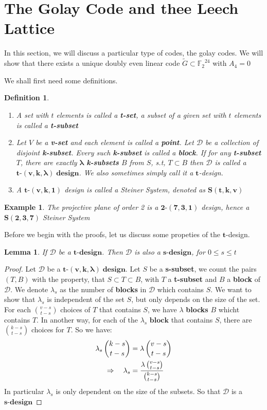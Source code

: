 \documentclass{article}
\newtheorem{lemma}[theorem]{Lemma}
\newtheorem{definition}[theorem]{Definition}
\newtheorem{example}[theorem]{Example}
\numberwithin{equation}{theorem}
\numberwithin{figure}{theorem}
\newcommand{\GExtend}{\ensuremath{\widetilde{G}}}
\newcommand{\Ftwo}{\ensuremath{\mathbb{F}_2}}
\newcommand{\tCompleteDesign}{\ensuremath{\bm{t\mbox{-}(v,k,\lambda)\; design}}}
\newcommand{\myBlock}{\textbf{block}}
\newcommand{\pluralMyBlock}{\textbf{blocks}}
\newcommand{\xDesign}[1]{\ensuremath{\bm{#1\mbox{-}design}}}
\begin{document}
\section{The Golay Code and thee Leech Lattice}
In this section, we will discuss a particular type of codes, the golay codes. We will show that there exists a unique doubly even linear code  $\GExtend \subset \Ftwo^{24}$ with $A_4 = 0$ 

We shall first need some definitions.
\begin{definition}\label{designDef} \hfill
	\begin{enumerate}
		\item A set with $t$ elements is called a \textbf{t-set}, a subset of a given set with $t$ elements is called a \textbf{t-subset}
		\item Let $V$ be a \textbf{v-set} and each element is called a \textbf{point}. Let $\mathscr{D}$ be a collection of disjoint \textbf{k-subset}. Every such \textbf{k-subset} is called a \textbf{block}. If for any \textbf{t-subset} $T$, there are exactly $\mathbf{\lambda}$ \textbf{k-subsets} $B$ from $S$, s.t, $T \subset B$ then $\mathscr{D}$ is called a \tCompleteDesign . We also sometimes simply call it a $\bm{t}$-design.
		\item A $\bm{t\mbox{-}(v,k,1)}$ design is called a \emph{Steiner System}, denoted as $\bm{S(t,k,v)}$
	\end{enumerate}
\end{definition}
\begin{example}\label{projPlane}
		The projective plane of order 2 is a $\bm{2\mbox{-}(7,3,1)}$ design, hence a $\bm{S(2,3,7)}$ \emph{Steiner System}
\end{example}

Before we begin with the proofs, let us discuss some propeties of the $\bm{t}$-design.
\begin{lemma}\label{propTdesign}
If $\mathscr{D}$ be a $\bm{t\mbox{-}design}$. Then $\mathscr{D}$ is also a $\bm{s\mbox{-}design}$, for $0 \leq s \leq t$
\end{lemma}
\begin{proof}
Let $\mathscr{D}$ be a \tCompleteDesign.
Let $S$ be a \textbf{s-subset}, we count the pairs $(T,B)$ with the property, that $S \subset T \subset B$, with $T$ a \textbf{t-subset} and $B$ a \textbf{block} of $\mathscr{D}$. We denote $\lambda_s$ as the number of \textbf{blocks} in $\mathscr{D}$ which contains $S$. We want to show that $\lambda_s$ is independent of the set $S$, but only depends on the size of the set. 
For each $\binom{v-s}{t-s}$ choices of $T$ that contains $S$, we have $\lambda$ {\pluralMyBlock} $B$ whicht contains $T$. In another way, for each of the $\lambda_s$ $\myBlock$ that contains $S$, there are $\binom{k-s}{t-s}$ choices for $T$. So we have:
\begin{align}
	\lambda_s \, \binom{k-s}{t-s} &= \lambda \, \binom{v-s}{t-s} \notag\\
	\Rightarrow  \quad \lambda_s &= \frac{\lambda \, \binom{v-s}{t-s}}{\binom{k-s}{t-s}} \label{sDesign}
\end{align}
In particular $\lambda_s$ is only dependent on the size of the subsets. So that $\mathscr{D}$ is a \xDesign{s}
\end{proof}
\end{document}
